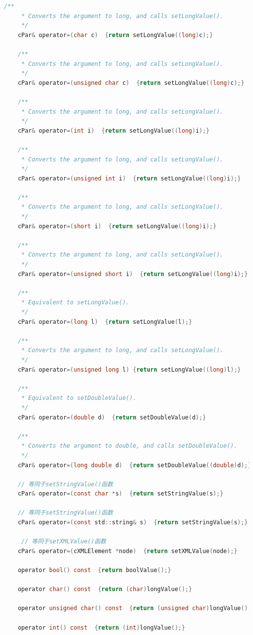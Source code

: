 \begin{lstlisting}[language=c]
    /**
     * Converts the argument to long, and calls setLongValue().
     */
    cPar& operator=(char c)  {return setLongValue((long)c);}

    /**
     * Converts the argument to long, and calls setLongValue().
     */
    cPar& operator=(unsigned char c)  {return setLongValue((long)c);}

    /**
     * Converts the argument to long, and calls setLongValue().
     */
    cPar& operator=(int i)  {return setLongValue((long)i);}

    /**
     * Converts the argument to long, and calls setLongValue().
     */
    cPar& operator=(unsigned int i)  {return setLongValue((long)i);}

    /**
     * Converts the argument to long, and calls setLongValue().
     */
    cPar& operator=(short i)  {return setLongValue((long)i);}

    /**
     * Converts the argument to long, and calls setLongValue().
     */
    cPar& operator=(unsigned short i)  {return setLongValue((long)i);}

    /**
     * Equivalent to setLongValue().
     */
    cPar& operator=(long l)  {return setLongValue(l);}

    /**
     * Converts the argument to long, and calls setLongValue().
     */
    cPar& operator=(unsigned long l) {return setLongValue((long)l);}

    /**
     * Equivalent to setDoubleValue().
     */
    cPar& operator=(double d)  {return setDoubleValue(d);}

    /**
     * Converts the argument to double, and calls setDoubleValue().
     */
    cPar& operator=(long double d)  {return setDoubleValue((double)d);}

    // 等同于setStringValue()函数
    cPar& operator=(const char *s)  {return setStringValue(s);}

    // 等同于setStringValue()函数
    cPar& operator=(const std::string& s)  {return setStringValue(s);}

     // 等同于setXMLValue()函数
    cPar& operator=(cXMLElement *node)  {return setXMLValue(node);}

    operator bool() const  {return boolValue();}

    operator char() const  {return (char)longValue();}

    operator unsigned char() const  {return (unsigned char)longValue();}

    operator int() const  {return (int)longValue();}


\end{lstlisting}
